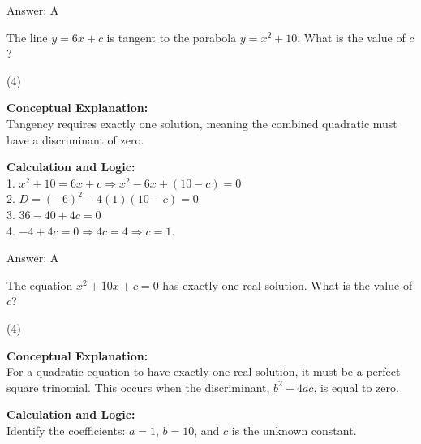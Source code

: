 \documentclass[11pt,paper=a4,answers]{exam}
\begin{document}
\begin{questions}
\begin{solution}
Answer: \colorbox{yellow!100}{A}
\end{solution}

\vspace{40pt}

\question
The line $y = 6x + c$ is tangent to the parabola $y = x^2 + 10$. What is the value of $c$?
\begin{tasks}(4)
\end{tasks}

\begin{solution}
\textbf{Conceptual Explanation:} \\
Tangency requires exactly one solution, meaning the combined quadratic must have a discriminant of zero.

\vspace{20pt}

\textbf{Calculation and Logic:} \\
1. $x^2 + 10 = 6x + c \Rightarrow x^2 - 6x + (10 - c) = 0$ \\
2. $D = (-6)^2 - 4(1)(10 - c) = 0$ \\
3. $36 - 40 + 4c = 0$ \\
4. $-4 + 4c = 0 \Rightarrow 4c = 4 \Rightarrow c = 1$.

\vspace{25pt}

Answer: \colorbox{yellow!100}{A}
\end{solution}

\question
The equation $x^2 + 10x + c = 0$ has exactly one real solution. What is the value of $c$?
\begin{tasks}(4)
\end{tasks}

\begin{solution}
\textbf{Conceptual Explanation:} \\
For a quadratic equation to have exactly one real solution, it must be a perfect square trinomial. This occurs when the discriminant, $b^2 - 4ac$, is equal to zero.

\vspace{20pt}

\textbf{Calculation and Logic:} \\
Identify the coefficients: $a = 1$, $b = 10$, and $c$ is the unknown constant.


\end{solution}
\end{questions}
\end{document}
